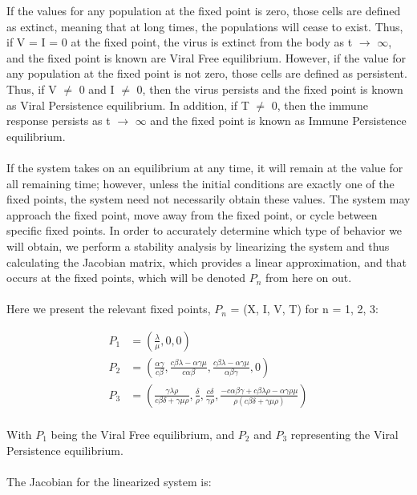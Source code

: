 \documentclass{article}
\begin{document}
If the values for any population at the fixed point is zero, those cells are defined as extinct, meaning that at long times, the populations will cease to exist. Thus, if V = I = 0 at the fixed point, the virus is extinct from the body as t $\rightarrow$ $\infty$, and the fixed point is known are Viral Free equilibrium. However, if the value for any population at the fixed point is not zero, those cells are defined as persistent. Thus, if V $\neq$ 0 and I $\neq$ 0, then the virus persists and the fixed point is known as Viral Persistence equilibrium. In addition, if T $\neq$ 0, then the immune response persists as t $\rightarrow$ $\infty$ and the fixed point is known as Immune Persistence equilibrium.\\
\\
If the system takes on an equilibrium at any time, it will remain at the value for all remaining time; however, unless the initial conditions are exactly one of the fixed points, the system need not necessarily obtain these values. The system may approach the fixed point, move away from the fixed point, or cycle between specific fixed points. In order to accurately determine which type of behavior we will obtain, we perform a stability analysis by linearizing the system and thus calculating the Jacobian matrix, which provides a linear approximation, and that occurs at the fixed points, which will be denoted $P_{n}$ from here on out.\\
\\
Here we present the relevant fixed points, $P_{n}$ = (X, I, V, T) for n = 1, 2, 3:

\begin{equation}
	\begin{split}
		P_{1} &= (\frac{\lambda}{\mu}, 0, 0)\\	
		P_{2} &= (\frac{\alpha \gamma}{c \beta}, \frac{c  \beta \lambda - \alpha \gamma \mu}{c \alpha \beta}, \frac{c \beta \lambda - \alpha \gamma \mu}{\alpha \beta \gamma}, 0)\\
		P_{3} &= (\frac{\gamma \lambda \rho}{c \beta \delta + \gamma \mu \rho}, \frac{\delta}{\rho}, \frac{c \delta}{\gamma \rho}, \frac{-c \alpha \beta \gamma + c \beta \lambda \rho - \alpha \gamma \rho \mu}{\rho (c \beta \delta + \gamma \mu \rho)})\\
	\end{split}
\end{equation}

With $P_{1}$ being the Viral Free equilibrium, and $P_{2}$ and $P_{3}$ representing the Viral Persistence equilibrium.\\
\\
The Jacobian for the linearized system is:\\
\end{document}
